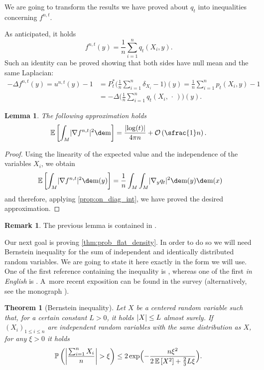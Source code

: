 \documentclass[JEP,XML,SOM,Unicode]{cedram}
\newcounter{results}[section]
\theoremstyle{plain}
\newtheorem{theorem}[results]{Theorem}
\newtheorem{lemma}[results]{Lemma}
\theoremstyle{definition}
\newtheorem{remark}[results]{Remark}
\numberwithin{equation}{section}
\newcommand{\E}[1]{\ensuremath{\operatorname{\mathbb{E}}\left[#1\right]}}
\newcommand{\emptyparam}{\ensuremath{\,\cdot\,}}
\newcommand{\lapl}{\ensuremath{\Delta}}
\newcommand{\bigo}{\ensuremath{\mathcal{O}}}
\renewcommand{\P}[1]{\ensuremath{\operatorname{\mathbb{P}}\left(#1\right)}}
\newcommand{\fullstop}{\ensuremath{\text{. }}}
\newcommand{\m}{\ensuremath{\mathrm m}}
\DeclarePairedDelimiter\abs{\lvert}{\rvert}
\begin{document}
We are going to transform the results we have proved about $q_t$ into inequalities concerning $f^{n,t}$.

As anticipated, it holds
\begin{equation}\label{eq:f_as_average}
f^{n,t}(y) = \frac1n\sum_{i=1}^n q_t(X_i, y)\fullstop
\end{equation}
Such an identity can be proved showing that both sides have null mean and the same Laplacian:
\begin{align*}
-\lapl f^{n,t}(y) = u^{n,t}(y)-1 &= P^*_t\biggl(\frac1n \sum_{i=1}^n \delta_{X_i}-1\biggr)(y)
= \frac1n\sum_{i=1}^n p_t(X_i,y)-1 \\
&= -\lapl\biggl(\frac1n\sum_{i=1}^n q_t(X_i, \emptyparam)\biggr)(y) \fullstop
\end{align*}

\begin{lemma}\label{lem:int_nabla_f}
The following approximation holds
\begin{equation*}
\E{\int_M\abs{\nabla f^{n,t}}^2\de\m}
= \frac{\abs{\log(t)}}{4\pi n} + \bigo\left(\sfrac{1}n\right) \fullstop
\end{equation*}
\end{lemma}
\begin{proof}
Using the linearity of the expected value and the independence of the variables $X_i$, we obtain
\begin{equation*}
\E{\int_M\abs{\nabla f^{n,t}}^2\de\m(y)} =\frac1n\int_M\int_M\abs{\nabla_y q_t}^2\de\m(y)\de\m(x)
\end{equation*}
and therefore, applying \cref{prop:on_diag_int}, we have proved the desired approximation.
\end{proof}
\begin{remark}
The previous lemma is contained in \cite[Lem.\,3.16]{Ambrosio-Stra-Trevisan2018}.
\end{remark}

Our next goal is proving \cref{thm:prob_flat_density}.
In order to do so we will need Bernstein inequality for the sum of independent and identically
distributed random variables.
We are going to state it here exactly in the form we will use.
One of the first reference containing the inequality is \cite{Bernstein46}, whereas one of the
first \emph{in English} is \cite{Hoeffding63}.
A~more recent exposition can be found in the survey \cite[Th.\,3.6,3.7]{ChungLu2006} (alternatively, see the monograph \cite{boucheron2003}).

\begin{theorem}[Bernstein inequality]\label{thm:bernstein}
Let $X$ be a centered random variable such that, for a certain constant $L>0$,
it holds $\abs{X}\leq L$ almost surely.
If $(X_i)_{1\le i\le n}$ are independent random variables with the same distribution as $X$,
for any $\xi>0$ it holds
\begin{equation*}
\P{\abs*{\frac{\sum_{i=1}^n X_i}{n}}>\xi}
\le 2\exp\Bigl(-\frac{n\xi^2}{2\E{X^2}+\frac23L\xi}\Bigr) \fullstop
\end{equation*}
\end{theorem}
\end{document}

